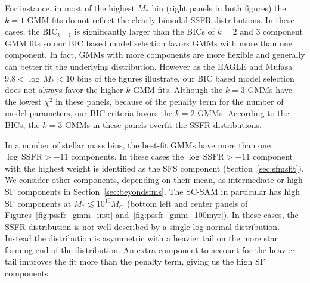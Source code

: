 \documentclass[preprint2,tighten]{aastex62}
\begin{document}
{For instance, in most of the highest $M_*$ bin (right panels in both figures) 
the $k=1$ GMM fits do not reflect the clearly bimodal SSFR distributions.
In these cases, the $\mathrm{BIC}_{k=1}$ is significantly larger than
the BICs of $k = 2$ and $3$ component GMM fits so our BIC based model 
selection favors GMMs with more than one component. In fact, GMMs with
more components are more flexible and generally can better fit the underlying 
distribution. However as the EAGLE and {\sc Mufasa} $9.8 <\log\,M_*<10$ 
bins of the figures illustrate, our BIC based model selection does not 
always favor the higher $k$ GMM fits. Although the $k=3$ GMMs have the 
lowest $\chi^2$ in these panels, because of the penalty term for the 
number of model parameters, our BIC criteria favors the $k=2$ GMMs.
According to the BICs, the $k=3$ GMMs in these panels overfit the 
SSFR distributions.

In a number of stellar mass bins, the best-fit GMMs have more than one 
$\log\,\mathrm{SSFR} > -11$ components. In these cases the 
$\log\,\mathrm{SSFR} > -11$ component with the highest weight is identified
as the SFS component (Section~\ref{sec:sfmsfit}). We consider other 
components, depending on their mean, as intermediate or high SF components in 
Section~\ref{sec:beyondsfms}. The SC-SAM in particular has high SF
components at $M_* \lesssim 10^{10}M_\odot$ (bottom left and center panels
of Figures~\ref{fig:pssfr_gmm_inst}  and~\ref{fig:pssfr_gmm_100myr}).
In these cases, the SSFR distribution is not well described by a single 
log-normal distribution. Instead the distribution is asymmetric with a 
heavier tail on the more star forming end of the distribution. An
extra component to account for the heavier tail improves the fit more 
than the penalty term, giving us the high SF components.}

\end{document}
